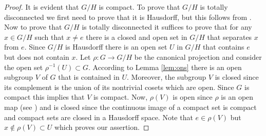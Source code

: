 \documentclass[12pt]{article}
\theoremstyle{definition}
\theoremstyle{remark}
\begin{document}
    \begin{proof}
        It is evident that $G/H$ is compact. To prove that $G/H$ is totally disconnected we first need to prove that it is Hausdorff, but this follows from \cite[Proposition 1-3 and Proposition 1-4(iii)]{FANF1999}. Now to prove that $G/H$ is totally disconnected it suffices to prove that for any $x\in G/H$ such that $x\neq e$ there is a closed and open set in $G/H$ that separates $x$ from $e$. Since $G/H$ is Hausdorff there is an open set $U$ in $G/H$ that contains $e$ but does not contain $x$. Let $\rho\colon G\to G/H$ be the canonical projection and consider the open set $\rho^{-1}(U)\subset G$. According to Lemma \ref{lem:ons} there is an open subgroup $V$ of $G$ that is contained in $U$. Moreover, the subgroup $V$ is closed since its complement is the union of its nontrivial cosets which are open. Since $G$ is compact this implies that $V$ is compact. Now, $\rho(V)$ is open since $\rho$ is an open map (see \cite[Proposition 1-4(ii)]{FANF1999}) and is closed since the continuous image of a compact set is compact and compact sets are closed in a Hausdorff space. Note that $e\in\rho(V)$ but $x\not\in\rho(V)\subset U$ which proves our assertion.
    \end{proof}

    \printbibliography
\end{document}
